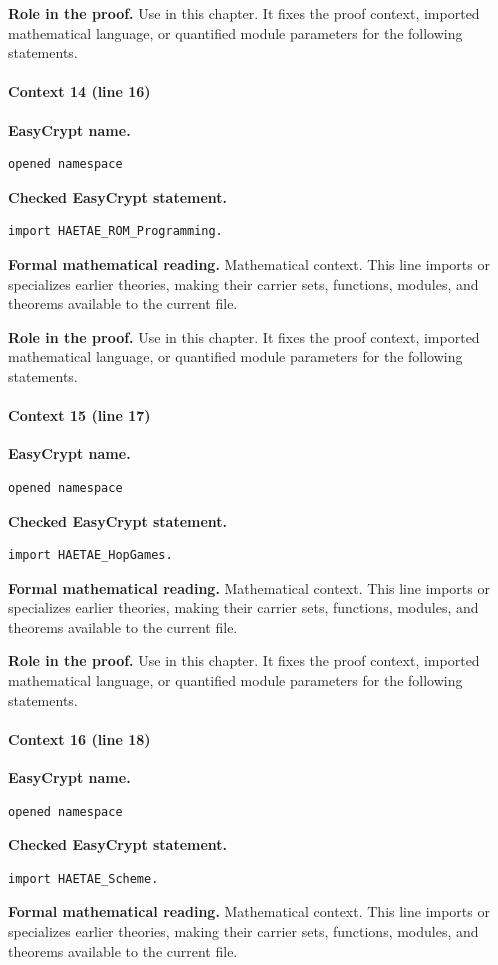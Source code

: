 \noindent\textbf{Role in the proof.}
Use in this chapter. It fixes the proof context, imported mathematical language, or quantified module parameters for the following statements.

\paragraph{Context 14 (line 16)}
\noindent\textbf{EasyCrypt name.}
\begin{lstlisting}[language=EasyCrypt,basicstyle=\ttfamily\scriptsize]
opened namespace
\end{lstlisting}
\noindent\textbf{Checked EasyCrypt statement.}
\begin{lstlisting}[language=EasyCrypt,basicstyle=\ttfamily\scriptsize]
import HAETAE_ROM_Programming.
\end{lstlisting}
\noindent\textbf{Formal mathematical reading.}
Mathematical context. This line imports or specializes earlier theories, making their carrier sets, functions, modules, and theorems available to the current file.

\noindent\textbf{Role in the proof.}
Use in this chapter. It fixes the proof context, imported mathematical language, or quantified module parameters for the following statements.

\paragraph{Context 15 (line 17)}
\noindent\textbf{EasyCrypt name.}
\begin{lstlisting}[language=EasyCrypt,basicstyle=\ttfamily\scriptsize]
opened namespace
\end{lstlisting}
\noindent\textbf{Checked EasyCrypt statement.}
\begin{lstlisting}[language=EasyCrypt,basicstyle=\ttfamily\scriptsize]
import HAETAE_HopGames.
\end{lstlisting}
\noindent\textbf{Formal mathematical reading.}
Mathematical context. This line imports or specializes earlier theories, making their carrier sets, functions, modules, and theorems available to the current file.

\noindent\textbf{Role in the proof.}
Use in this chapter. It fixes the proof context, imported mathematical language, or quantified module parameters for the following statements.

\paragraph{Context 16 (line 18)}
\noindent\textbf{EasyCrypt name.}
\begin{lstlisting}[language=EasyCrypt,basicstyle=\ttfamily\scriptsize]
opened namespace
\end{lstlisting}
\noindent\textbf{Checked EasyCrypt statement.}
\begin{lstlisting}[language=EasyCrypt,basicstyle=\ttfamily\scriptsize]
import HAETAE_Scheme.
\end{lstlisting}
\noindent\textbf{Formal mathematical reading.}
Mathematical context. This line imports or specializes earlier theories, making their carrier sets, functions, modules, and theorems available to the current file.

